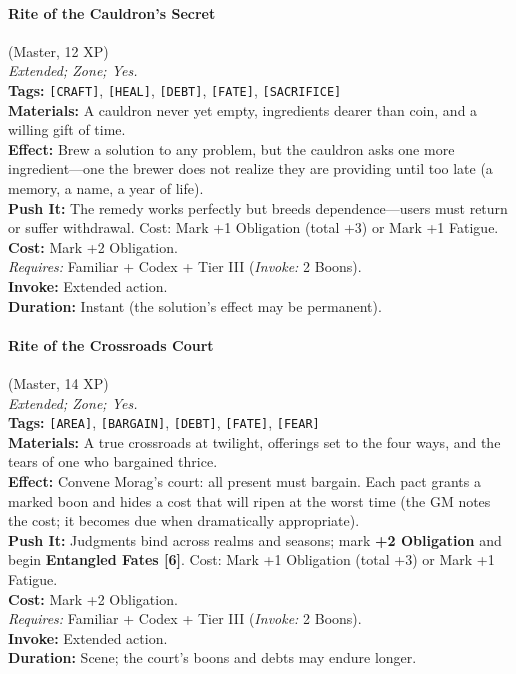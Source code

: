 \paragraph{Rite of the Cauldron's Secret} (Master, 12 XP) \hfill \\
\emph{Extended; Zone; Yes.} \\
\textbf{Tags:} \texttt{[CRAFT]}, \texttt{[HEAL]}, \texttt{[DEBT]}, \texttt{[FATE]}, \texttt{[SACRIFICE]} \\
\textbf{Materials:} A cauldron never yet empty, ingredients dearer than coin, and a willing gift of time. \\
\textbf{Effect:} Brew a solution to any problem, but the cauldron asks one more ingredient---one the brewer does not realize they are providing until too late (a memory, a name, a year of life). \\
\textbf{Push It:} The remedy works perfectly but breeds dependence---users must return or suffer withdrawal. Cost: Mark +1 Obligation (total +3) or Mark +1 Fatigue. \\
\textbf{Cost:} Mark +2 Obligation. \\
\textit{Requires:} Familiar + Codex + Tier III (\textit{Invoke:} 2 Boons). \\
\textbf{Invoke:} Extended action. \\
\textbf{Duration:} Instant (the solution's effect may be permanent).

\paragraph{Rite of the Crossroads Court} (Master, 14 XP) \hfill \\
\emph{Extended; Zone; Yes.} \\
\textbf{Tags:} \texttt{[AREA]}, \texttt{[BARGAIN]}, \texttt{[DEBT]}, \texttt{[FATE]}, \texttt{[FEAR]} \\
\textbf{Materials:} A true crossroads at twilight, offerings set to the four ways, and the tears of one who bargained thrice. \\
\textbf{Effect:} Convene Morag's court: all present must bargain. Each pact grants a marked boon and hides a cost that will ripen at the worst time (the GM notes the cost; it becomes due when dramatically appropriate). \\
\textbf{Push It:} Judgments bind across realms and seasons; mark \textbf{+2 Obligation} and begin \textbf{Entangled Fates [6]}. Cost: Mark +1 Obligation (total +3) or Mark +1 Fatigue. \\
\textbf{Cost:} Mark +2 Obligation. \\
\textit{Requires:} Familiar + Codex + Tier III (\textit{Invoke:} 2 Boons). \\
\textbf{Invoke:} Extended action. \\
\textbf{Duration:} Scene; the court's boons and debts may endure longer.

